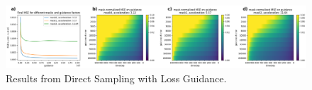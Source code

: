 \begin{figure}[h]
    \centering
    \includegraphics[width=\textwidth]{images/direct_sampling.png}
    \caption[Direct Sampling with Loss Guidance]{Results from Direct Sampling with Loss Guidance.}
\end{figure}
